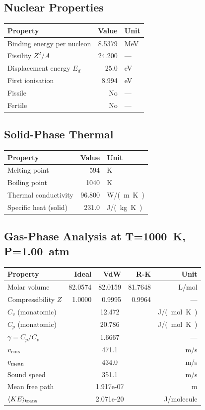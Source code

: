 \documentclass[11pt,a4paper]{article}
\begin{document}
\subsection{Nuclear Properties}
\begin{tabular}{lrl}
  \toprule
  Property & Value & Unit \\
  \midrule
  Binding energy per nucleon & 8.5379 & \si{MeV} \\
  Fissility $Z^2/A$ & 24.200 & --- \\
  Displacement energy $E_d$ & 25.0 & \si{eV} \\
  First ionisation & 8.994 & \si{eV} \\
  Fissile & No & --- \\
  Fertile & No & --- \\
  \bottomrule
\end{tabular}

\subsection{Solid-Phase Thermal}
\begin{tabular}{lrl}
  \toprule
  Property & Value & Unit \\
  \midrule
  Melting point & 594 & \si{K} \\
  Boiling point & 1040 & \si{K} \\
  Thermal conductivity & 96.800 & \si{W/(m.K)} \\
  Specific heat (solid) & 231.0 & \si{J/(kg.K)} \\
  \bottomrule
\end{tabular}

\subsection{Gas-Phase Analysis at T=\SI{1000}{K}, P=\SI{1.00}{atm}}
\begin{tabular}{lrrrr}
  \toprule
  Property & Ideal & VdW & R-K & Unit \\
  \midrule
  Molar volume & 82.0574 & 82.0159 & 81.7648 & \si{L/mol} \\
  Compressibility $Z$ & 1.0000 & 0.9995 & 0.9964 & --- \\
  \midrule
  $C_v$ (monatomic) & \multicolumn{3}{c}{12.472} & \si{J/(mol.K)} \\
  $C_p$ (monatomic) & \multicolumn{3}{c}{20.786} & \si{J/(mol.K)} \\
  $\gamma = C_p/C_v$ & \multicolumn{3}{c}{1.6667} & --- \\
  $v_{\rm rms}$ & \multicolumn{3}{c}{471.1} & \si{m/s} \\
  $v_{\rm mean}$ & \multicolumn{3}{c}{434.0} & \si{m/s} \\
  Sound speed & \multicolumn{3}{c}{351.1} & \si{m/s} \\
  Mean free path & \multicolumn{3}{c}{1.917e-07} & \si{m} \\
  $\langle KE \rangle_{\rm trans}$ & \multicolumn{3}{c}{2.071e-20} & \si{J/molecule} \\
  \bottomrule
\end{tabular}
\end{document}
